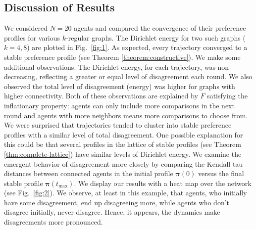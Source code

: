\documentclass[conference]{ieeeconf}
\newcommand{\profile}{\boldsymbol{\pi}}
\begin{document}
\vspace{-0.25em}
\subsection{Discussion of Results}
\vspace{-0.25em}

We considered $N=20$ agents and compared the convergence of their preference profiles for various $k$-regular graphs. The Dirichlet energy for two such graphs ($k=4,8$) are plotted in Fig.~\ref{fig:1}. As expected, every trajectory converged to a stable preference profile (see Theorem \ref{theorem:constructive}). We make some additional observations. The Dirichlet energy, for each trajectory, was non-decreasing, reflecting a greater or equal level of disagreement each round. We also observed the total level of disagreement (energy) was higher for graphs with higher connectivity. Both of these observations are explained by $F$ satisfying the inflationary property: agents can only include more comparisons in the next round and agents with more neighbors means more comparisons to choose from. We were surprised that trajectories tended to cluster into stable preference profiles with a similar level of total disagreement. One possible explanation for this could be that several profiles in the lattice of stable profiles (see Theorem \ref{thm:complete-lattice}) have similar levels of Dirichlet energy. We examine the emergent behavior of disagreement more closely by comparing the Kendall tau distances between connected agents in the initial profile $\profile(0)$ versus the final stable profile $\profile(t_{\max})$. We display our results with a heat map over the network (see Fig.~\ref{fig:2}). We observe, at least in this example, that agents, who initially have some disagreement, end up disagreeing more, while agents who don't disagree initially, never disagree. Hence, it appears, the dynamics make disagreements more pronounced.
\end{document}
